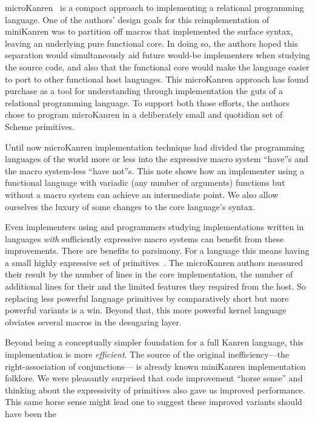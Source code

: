 \documentclass[sigplan,screen,draft,anonymous,review,natbib=false]{acmart}
\begin{document}
microKanren~\cite{hemann2013muKanren} is a compact approach to
implementing a relational programming language. One of the authors'
design goals for this reimplementation of miniKanren was to partition
off macros that implemented the surface syntax, leaving an underlying
pure functional core. In doing so, the authors hoped this separation
would simultaneously aid future would-be implementers when studying
the source code, and also that the functional core would make the
language easier to port to other functional host languages. This
microKanren approach has found purchase as a tool for understanding
through implementation the guts of a relational programming language.
To support both those efforts, the authors chose to program
microKanren in a deliberately small and quotidian set of Scheme
primitives.

Until now microKanren implementation technique had divided the
programming languages of the world more or less into the expressive
macro system \enquote{have}s and the macro system-less \enquote{have
  not}s. This note shows how an implementer using a functional
language with variadic (any number of arguments) functions but without
a macro system can achieve an intermediate point. We also allow
ourselves the luxury of some changes to the core language's syntax.

Even implementers using and programmers studying implementations
written in languages \emph{with} sufficiently expressive macro systems
can benefit from these improvements. There are benefits to parsimony.
For a language this means having a small highly expressive set of
primitives~\cite{somedescriptionofscheme}. The microKanren authors
measured their result by the number of lines in the core
implementation, the number of additional lines for their and the
limited features they required from the host. So replacing less
powerful language primitives by comparatively short but more powerful
variants is a win. Beyond that, this more powerful kernel language
obviates several macros in the desugaring layer.

Beyond being a conceptually simpler foundation for a full Kanren
language, this implementation is more \emph{efficient}. The source of
the original inefficiency---the right-association of conjunctions---
is already known miniKanren implementation folklore. We were
pleasantly surprised that code improvement \enquote{horse sense} and
thinking about the expressivity of primitives also gave us improved
performance. This same horse sense might lead one to suggest these
improved variants should have been the
\end{document}
